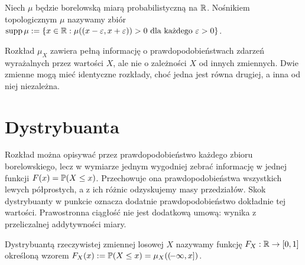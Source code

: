 \begin{definicja}
Niech $\mu$ będzie borelowską miarą probabilistyczną na $\mathbb{R}$.
Nośnikiem topologicznym $\mu$ nazywamy zbiór
$\operatorname{supp}\mu:=\{x\in\mathbb{R}:\mu((x-\varepsilon,x+\varepsilon))>0
\text{ dla każdego }\varepsilon>0\}$.
\end{definicja}

\begin{uwaga}
Rozkład $\mu_X$ zawiera pełną informację o prawdopodobieństwach
zdarzeń wyrażalnych przez wartości $X$, ale nie o zależności $X$
od innych zmiennych. Dwie zmienne mogą mieć identyczne rozkłady,
choć jedna jest równa drugiej, a inna od niej niezależna.
\end{uwaga}

\section{Dystrybuanta}
Rozkład można opisywać przez prawdopodobieństwo każdego zbioru
borelowskiego, lecz w wymiarze jednym wygodniej zebrać
informację w jednej funkcji $F(x)=\mathbb{P}(X\leq x)$.
Przechowuje ona prawdopodobieństwa wszystkich lewych półprostych,
a z ich różnic odzyskujemy masy przedziałów. Skok dystrybuanty
w punkcie oznacza dodatnie prawdopodobieństwo dokładnie tej wartości.
Prawostronna ciągłość nie jest dodatkową umową: wynika z
przeliczalnej addytywności miary.

\begin{definicja}
Dystrybuantą rzeczywistej zmiennej losowej $X$ nazywamy funkcję
$F_X:\mathbb{R}\to[0,1]$ określoną wzorem
$F_X(x):=\mathbb{P}(X\leq x)=\mu_X((\! -\infty,x])$.
\end{definicja}

